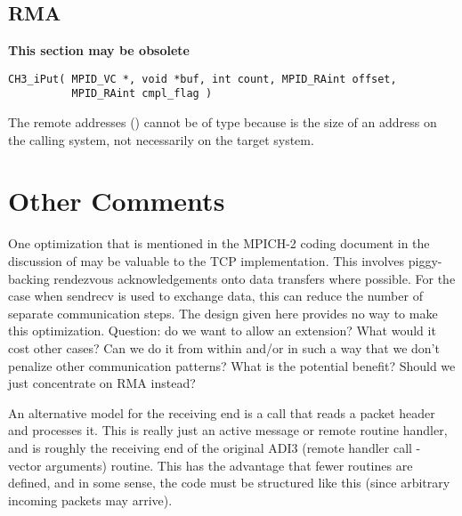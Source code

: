 \documentclass{article}
\begin{document}
\subsection{RMA}
\textbf{This section may be obsolete}
\begin{verbatim}
CH3_iPut( MPID_VC *, void *buf, int count, MPID_RAint offset, 
          MPID_RAint cmpl_flag )
\end{verbatim}
The remote addresses () cannot be of type 
because  
is the size of an address on the calling system, not necessarily on
the target system.  

\section{Other Comments}
One optimization that is mentioned in the MPICH-2 coding document
\cite{mpich2} in the discussion of  may be valuable
to the TCP implementation.  This involves piggy-backing rendezvous
acknowledgements onto data transfers where possible.  For the case
when sendrecv is used to exchange data, this can reduce the number of
separate communication steps.  The design given here provides no way
to make this optimization.  Question: do we want to allow an
extension?  What would it cost other cases?  Can we do it from within
 and/or  in such a way that we
don't penalize other communication patterns?  What is the potential
benefit?  Should we just concentrate on RMA instead?

An alternative model for the receiving end is a
 call that reads a packet header and
processes it.  This is really just an active message or remote routine
handler, and is roughly the receiving end of the original ADI3
 (remote handler call - vector arguments) routine.
This has the advantage that fewer routines are defined, and in some
sense, the code must be structured like this (since arbitrary incoming
packets may arrive).  
\end{document}
